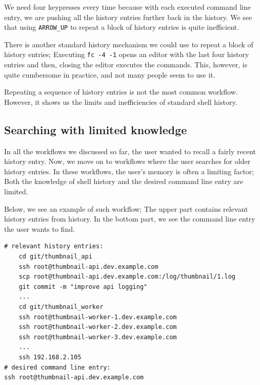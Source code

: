 We need four keypresses every time because with each executed command line entry, we are pushing all the history entries further back in the history. We see that using \verb|ARROW_UP| to repeat a block of history entries is quite inefficient. 

There is another standard history mechanism we could use to repeat a block of history entries; 
Executing \verb|fc -4 -1| opens an editor with the last four history entries and then, closing the editor executes the commands. This, however, is quite cumbersome in practice, and not many people seem to use it. 


Repeating a sequence of history entries is not the most common workflow. However, it shows us the limits and inefficiencies of standard shell history.


\subsection{Searching with limited knowledge}\label{workflow-search-w-limited-knowledge}

In all the workflows we discussed so far, the user wanted to recall a fairly recent history entry. Now, we move on to workflows where the user searches for older history entries. In these workflows, the user's memory is often a limiting factor; Both the knowledge of shell history and the desired command line entry are limited.

Below, we see an example of such workflow; The upper part contains relevant history entries from history. In the bottom part, we see the command line entry the user wants to find. 



\begin{verbatim}
# relevant history entries:
    cd git/thumbnail_api
    ssh root@thumbnail-api.dev.example.com
    scp root@thumbnail-api.dev.example.com:/log/thumbnail/1.log
    git commit -m "improve api logging"
    ...
    cd git/thumbnail_worker
    ssh root@thumbnail-worker-1.dev.example.com
    ssh root@thumbnail-worker-2.dev.example.com
    ssh root@thumbnail-worker-3.dev.example.com
    ...
    ssh 192.168.2.105
# desired command line entry:
ssh root@thumbnail-api.dev.example.com
\end{verbatim}

